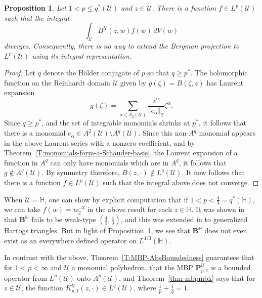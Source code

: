 \documentclass[letterpaper,11pt,reqno]{amsart}
\theoremstyle{plain}
\newtheorem{proposition}[equation]{Proposition}
\theoremstyle{definition}
\theoremstyle{remark}
\theoremstyle{remark}
\numberwithin{equation}{section}
\newcommand{\norm}[1]{\left\Vert#1\right\Vert}
\newcommand{\ol}{\overline}
\newcommand{\cs}{{\mathcal S}}
\newcommand{\h}{{\mathbb H}}
\newcommand{\Uu}{\mathscr{U}}
\begin{document}
\begin{proposition}\label{P:cant-extend}
Let $1<p \le q^*(\Uu) $ and $z\in \Uu$. 
There is a function $f\in L^p(\Uu)$ such that the integral
\[
\int_{\Uu} B^\Uu(z,w) f(w)\,dV(w)
\]
diverges. 
Consequently, there is no way to extend the Bergman projection to $L^p(\Uu)$ using its integral representation. 
\end{proposition}
\begin{proof}
Let $q$ denote the Hölder conjugate of $p$ so that $q\geq p^*$. 
The holomorphic function on the Reinhardt domain $\Uu$ given by $g(\zeta)= B(\zeta, z)$ has Laurent expansion
\[ 
g(\zeta)= \sum_{\alpha\in \cs_2(\Uu)} \frac{\ol{z}^\alpha}{\norm{e_\alpha}_2}\zeta^\alpha. 
\]
Since $q\geq p^*$, and the set of integrable monomials shrinks at $p^*$, it follows  that there is a monomial $e_\alpha\in A^2(\Uu) \setminus A^q(\Uu)$. 
Since this non-$A^q$ monomial appears in the above Laurent series with a nonzero coefficient, and by Theorem~\ref{T:monomials-form-a-Schauder-basis}, the Laurent expansion of a function in $A^q$ can only have monomials which are in $A^q$, it follows that $g\notin A^q(\Uu)$. 
By symmetry therefore, $B(z,\cdot)\not \in L^q(\Uu)$. 
It now follows that there is a function $f \in L^p(\Uu)$ such that the integral above does not converge.
\end{proof}
When $\Uu=\h$, one can show by explicit computation that if $1<p<\frac{4}{3} = q^*(\h)$, we can take $f(w)=w_2^{-3}$ in the above result for each $z\in \h$. 
It was shown  in \cite{HuoWick2020a} that $\bm{B}^\h$ fails to be weak-type $(\frac{4}{3},\frac{4}{3})$, and this was extended in \cite{koenig2} to generalized Hartogs triangles.
But in light of Proposition~\ref{P:cant-extend}, we see that $\bm{B}^\h$ does not even exist as an everywhere defined operator on $L^{4/3}(\h)$.

In contrast with the above, Theorem~\ref{T:MBP-AbsBoundedness} guarantees that for $1<p<\infty$ and $\Uu$ a monomial polyhedron, that the MBP $\bm{P}_{p,1}^\Uu$ is a bounded operator from $L^p(\Uu)$ onto $A^p(\Uu)$, and Theorem~\ref{thm-mbpmbk} says that for $z \in \Uu$, the function $K^\Uu_{p,1}(z,\cdot) \in L^q(\Uu)$, where $\frac{1}{p}+\frac{1}{q} = 1$.
\end{document}
